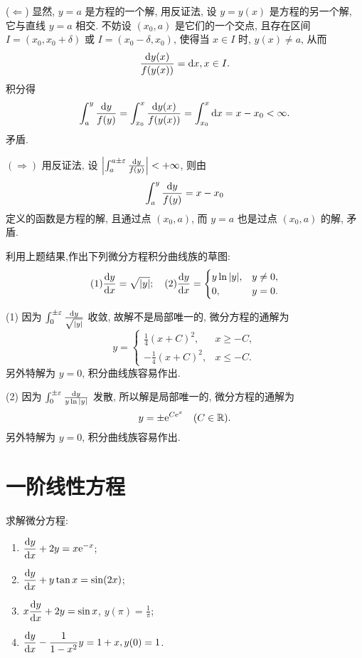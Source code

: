 \begin{solve}
  ($\Leftarrow$) 显然, $y=a$ 是方程的一个解, 用反证法, 设 $y=y(x)$ 是方程的另一个解, 
  它与直线 $y=a$ 相交. 不妨设 $(x_0,a)$ 是它们的一个交点, 
  且存在区间 $I=(x_0,x_0+\delta)$ 或 $I=(x_0-\delta,x_0)$, 
  使得当 $x\in I$ 时, $y(x)\neq a$, 从而
  \[\frac{\mathop{}\!\mathrm{d} y(x)}{f(y(x))}=\mathop{}\!\mathrm{d} x,x\in I.\]
  积分得
  \[\int_a^y\frac{\mathop{}\!\mathrm{d} y}{f(y)}=\int_{x_0}^x\frac{\mathop{}\!\mathrm{d} y(x)}{f(y(x))}
    = \int_{x_0}^x\mathop{}\!\mathrm{d} x = x-x_0<\infty.\]
  矛盾.

  $(\Rightarrow)$ 用反证法, 设 $\left|\int_a^{a\pm\varepsilon}\frac{\mathop{}\!\mathrm{d} y}{f(y)}\right|<+\infty$,
  则由
  \[\int_a^y\frac{\mathop{}\!\mathrm{d} y}{f(y)}=x-x_0\]
  定义的函数是方程的解, 且通过点 $(x_0,a)$, 而 $y=a$ 也是过点 $(x_0,a)$ 的解, 矛盾.
\end{solve}



\begin{exercise}
  利用上题结果,作出下列微分方程积分曲线族的草图:
  \[(1)\frac{\mathop{}\!\mathrm{d} y}{\mathop{}\!\mathrm{d} x}=\sqrt{|y|};\quad
  (2)\frac{\mathop{}\!\mathrm{d} y}{\mathop{}\!\mathrm{d} x}=
  \begin{cases}
    y\ln|y|, & y\neq 0, \\
    0,       & y=0.
  \end{cases}\]
\end{exercise}

\begin{solve}
(1) 因为 $\int_0^{\pm\varepsilon}\frac{\mathop{}\!\mathrm{d} y}{\sqrt{|y|}}$ 收敛, 故解不是局部唯一的, 微分方程的通解为
\[y=
  \begin{cases}
    \frac{1}{4}(x+C)^2,  & x\geq -C, \\
    -\frac{1}{4}(x+C)^2, & x\leq -C.
  \end{cases}\]
另外特解为 $y=0$, 积分曲线族容易作出.

(2) 因为 $\int_0^{\pm\varepsilon}\frac{\mathop{}\!\mathrm{d} y}{y\ln|y|}$ 发散, 所以解是局部唯一的, 微分方程的通解为
\[y=\pm\mathrm{e}^{C\mathrm{e}^x}\quad(C\in\mathbb{R}).\]
另外特解为 $y=0$, 积分曲线族容易作出.
\end{solve}



\section{一阶线性方程}



\begin{exercise}
  求解微分方程:
  \begin{enumerate}[(1)]
  \item $\displaystyle\frac{\mathop{}\!\mathrm{d} y}{\mathop{}\!\mathrm{d} x}+2y=x\mathrm{e}^{-x}$;
  \item $\displaystyle\frac{\mathop{}\!\mathrm{d} y}{\mathop{}\!\mathrm{d} x}+y\tan x=\sin(2x)$;
  \item $\displaystyle x\frac{\mathop{}\!\mathrm{d} y}{\mathop{}\!\mathrm{d} x}+2y=\sin x$, $y(\pi)=\frac{1}{\pi}$;
  \item $\displaystyle\frac{\mathop{}\!\mathrm{d} y}{\mathop{}\!\mathrm{d} x}-\frac{1}{1-x^2}y=1+x,y(0)=1$.
  \end{enumerate}
\end{exercise}

